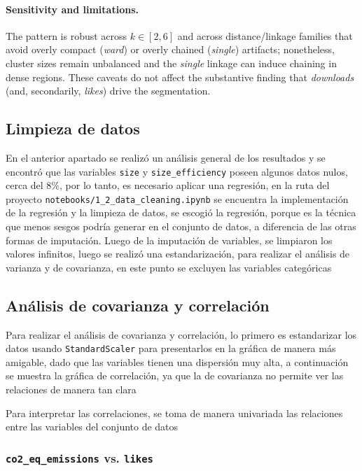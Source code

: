 \documentclass[journal]{IEEEtran}
\begin{document}
\paragraph{Sensitivity and limitations.}
The pattern is robust across $k\in[2,6]$ and across distance/linkage families that avoid overly compact
(\emph{ward}) or overly chained (\emph{single}) artifacts; nonetheless, cluster sizes remain unbalanced and
the \emph{single} linkage can induce chaining in dense regions. These caveats do not affect the substantive
finding that \emph{downloads} (and, secondarily, \emph{likes}) drive the segmentation.

	\subsection{Limpieza de datos}
	En el anterior apartado se realizó un análisis general de los resultados y se encontró que las variables \texttt{size} y \texttt{size\_efficiency} poseen algunos datos nulos, cerca del 8\%, por lo tanto, es necesario aplicar una regresión, en la ruta del proyecto \texttt{notebooks/1\_2\_data\_cleaning.ipynb} se encuentra la implementación de la regresión y la limpieza de datos, se escogió la regresión, porque es la técnica que menos sesgos podría generar en el conjunto de datos, a diferencia de las otras formas de imputación.
	Luego de la imputación de variables, se limpiaron los valores infinitos, luego se realizó una estandarización, para realizar el análisis de varianza y de covarianza, en este punto se excluyen las variables categóricas

	\subsection{Análisis de covarianza y correlación}
	Para realizar el análisis de covarianza y correlación, lo primero es estandarizar los datos usando \texttt{StandardScaler} para presentarlos en la gráfica de manera más amigable, dado que las variables tienen una dispersión muy alta, a continuación se muestra la gráfica de correlación, ya que la de covarianza no permite ver las relaciones de manera tan clara


	Para interpretar las correlaciones, se toma de manera univariada las relaciones entre las variables del conjunto de datos
	\subsubsection{\texttt{co2\_eq\_emissions} vs. \texttt{likes}}
\end{document}
